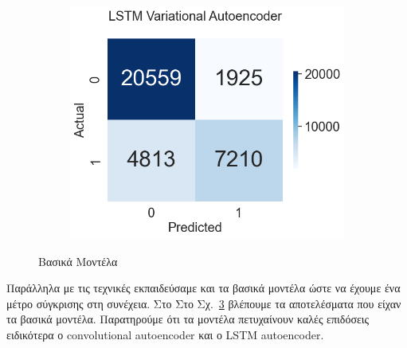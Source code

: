 \documentclass[a4paper,12pt]{report}
\theoremstyle{definitionNODot}
\begin{document}
\begin{figure}[H]
\begin{subfigure}[b]{0.35\textwidth}
			\label{fig:anomaly_by_lstm_ae}
		\end{subfigure}
		\medskip
		\begin{subfigure}[b]{0.35\textwidth}
			\centering
			\includegraphics[width=\textwidth]{anomaly_by_lstm_vae.png}
			
			\label{fig:anomaly_by_lstm_vae}
		\end{subfigure}
		\caption{Βασικά Μοντέλα}
		\label{fig:basicmodelsconfusion}
	\end{figure}
	
	Παράλληλα με τις τεχνικές εκπαιδεύσαμε και τα βασικά μοντέλα ώστε να έχουμε ένα μέτρο σύγκρισης στη συνέχεια. Στο Στο Σχ.~\ref{fig:basicmodelsconfusion} βλέπουμε τα αποτελέσματα που είχαν τα βασικά μοντέλα. Παρατηρούμε ότι τα μοντέλα πετυχαίνουν καλές επιδόσεις ειδικότερα ο convolutional autoencoder και ο LSTM autoencoder.
	
\end{document}
